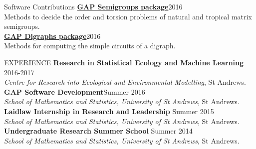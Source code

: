 \documentclass{resume} %
\begin{document}
\begin{rSection}{Software Contributions}
\href{https://www.gap-system.org/Packages/semigroups.html}{\textbf{GAP Semigroups package}}\hfill 2016\\ Methods to decide the order and torsion problems of natural and tropical matrix semigroups.\\ 
\href{https://www.gap-system.org/Packages/digraphs.html}{\textbf{GAP Digraphs package}}\hfill 2016\\ Methods for computing the simple circuits of a digraph.
\end{rSection}

\begin{rSection}{EXPERIENCE}
\textbf{Research in Statistical Ecology and Machine Learning} \hfill 2016-2017\\
\emph{Centre for Research into Ecological and Environmental Modelling}, {St Andrews.}\\
\textbf{GAP Software Development}\hfill Summer 2016\\
\emph{School of Mathematics and Statistics, University of St Andrews}, St Andrews.\\
\textbf{Laidlaw Internship in Research and Leadership} \hfill Summer 2015\\
\emph{School of Mathematics and Statistics, University of St Andrews}, St Andrews.\\
\textbf{Undergraduate Research Summer School} \hfill Summer 2014\\
\emph{School of Mathematics and Statistics, University of St Andrews}, St Andrews.\\

\end{rSection}




\end{document}
